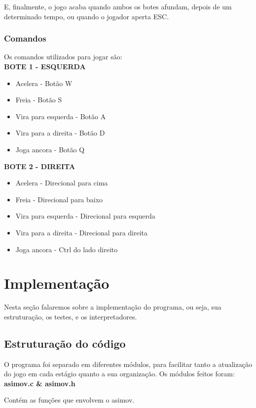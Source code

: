 \documentclass[12pt,a4paper]{article}
\begin{document}
E, finalmente, o jogo acaba quando ambos os botes afundam, depois de um determinado tempo, ou quando o jogador aperta ESC.

\subsubsection{Comandos}
Os comandos utilizados para jogar são:\\

\textbf{ BOTE 1 - ESQUERDA }
\begin{itemize}
\item Acelera             - Botão W
\item Freia               - Botão S
\item Vira para esquerda  - Botão A
\item Vira para a direita - Botão D
\item Joga ancora         - Botão Q
\end{itemize}


\textbf{BOTE 2 - DIREITA}
\begin{itemize}
\item Acelera             - Direcional para cima
\item Freia               - Direcional para baixo
\item Vira para esquerda  - Direcional para esquerda
\item Vira para a direita - Direcional para direita
\item Joga ancora         - Ctrl do lado direito
\end{itemize}

\section{Implementação}
Nesta seção falaremos sobre a implementação do programa, ou seja, sua estruturação, os testes, e os interpretadores.

\subsection{Estruturação do código}
O programa foi separado em diferentes módulos, para facilitar tanto a atualização do jogo em cada estágio quanto a sua organização.
Os módulos feitos foram:\\

\textbf{asimov.c \& asimov.h}

Contém as funções que envolvem o asimov.\\
\end{document}

